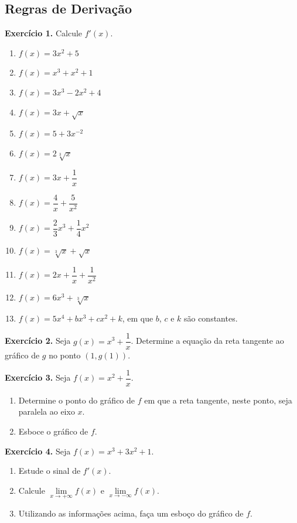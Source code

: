 \documentclass[12pt,a4paper]{article}
\begin{document}
\subsection{Regras de Derivação}
\vspace{0.5cm}
\noindent\textbf{Exercício 1.} Calcule $f'(x)$.
\begin{enumerate}
    \renewcommand{\theenumi}{\alph{enumi}}
    \renewcommand{\labelenumi}{\theenumi)}
    \item $f(x) = 3x^2 + 5$
    \item $f(x) = x^3 + x^2 + 1$
    \item $f(x) = 3x^3 - 2x^2 + 4$
    \item $f(x) = 3x + \sqrt{x}$
    \item $f(x) = 5 + 3x^{-2}$
    \item $f(x) = 2\sqrt[3]{x}$
    \item $f(x) = 3x + \dfrac{1}{x}$
    \item $f(x) = \dfrac{4}{x} + \dfrac{5}{x^2}$
    \item $f(x) = \dfrac{2}{3}x^3 + \dfrac{1}{4}x^2$
    \item $f(x) = \sqrt[3]{x} + \sqrt{x}$
    \item $f(x) = 2x + \dfrac{1}{x} + \dfrac{1}{x^2}$
    \item $f(x) = 6x^3 + \sqrt[3]{x}$
    \item $f(x) = 5x^4 + bx^3 + cx^2 + k$, em que $b$, $c$ e $k$ são constantes.
\end{enumerate}

\vspace{0.5cm}
\noindent\textbf{Exercício 2.}
Seja $g(x) = x^3 + \dfrac{1}{x}$. Determine a equação da reta tangente ao gráfico de $g$ no ponto $(1, g(1))$.

\vspace{0.5cm}
\noindent\textbf{Exercício 3.} Seja $f(x) = x^2 + \dfrac{1}{x}$.
\begin{enumerate}
    \renewcommand{\theenumi}{\alph{enumi}}
    \renewcommand{\labelenumi}{\theenumi)}
    \item Determine o ponto do gráfico de $f$ em que a reta tangente, neste ponto, seja paralela ao eixo $x$.
    \item Esboce o gráfico de $f$.
\end{enumerate}

\vspace{0.5cm}
\noindent\textbf{Exercício 4.} Seja $f(x) = x^3 + 3x^2 + 1$.
\begin{enumerate}
    \renewcommand{\theenumi}{\alph{enumi}}
    \renewcommand{\labelenumi}{\theenumi)}
    \item Estude o sinal de $f'(x)$.
    \item Calcule $\lim\limits_{x \to +\infty} f(x)$ e $\lim\limits_{x \to -\infty} f(x)$.
    \item Utilizando as informações acima, faça um esboço do gráfico de $f$.
\end{enumerate}
\end{document}
